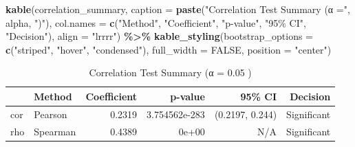 \documentclass[
  12pt,
]{article}
\newenvironment{Shaded}{\begin{snugshade}}{\end{snugshade}}
\newcommand{\AttributeTok}[1]{\textcolor[rgb]{0.13,0.29,0.53}{#1}}
\newcommand{\ConstantTok}[1]{\textcolor[rgb]{0.56,0.35,0.01}{#1}}
\newcommand{\FunctionTok}[1]{\textcolor[rgb]{0.13,0.29,0.53}{\textbf{#1}}}
\newcommand{\NormalTok}[1]{#1}
\newcommand{\SpecialCharTok}[1]{\textcolor[rgb]{0.81,0.36,0.00}{\textbf{#1}}}
\newcommand{\StringTok}[1]{\textcolor[rgb]{0.31,0.60,0.02}{#1}}
\begin{document}
\begin{Shaded}
\begin{Highlighting}[]
\FunctionTok{kable}\NormalTok{(correlation\_summary, }\AttributeTok{caption =} \FunctionTok{paste}\NormalTok{(}\StringTok{"Correlation Test Summary (α ="}\NormalTok{,}
\NormalTok{    alpha, }\StringTok{")"}\NormalTok{), }\AttributeTok{col.names =} \FunctionTok{c}\NormalTok{(}\StringTok{"Method"}\NormalTok{, }\StringTok{"Coefficient"}\NormalTok{, }\StringTok{"p{-}value"}\NormalTok{,}
    \StringTok{"95\% CI"}\NormalTok{, }\StringTok{"Decision"}\NormalTok{), }\AttributeTok{align =} \StringTok{"lrrrr"}\NormalTok{) }\SpecialCharTok{\%\textgreater{}\%}
    \FunctionTok{kable\_styling}\NormalTok{(}\AttributeTok{bootstrap\_options =} \FunctionTok{c}\NormalTok{(}\StringTok{"striped"}\NormalTok{, }\StringTok{"hover"}\NormalTok{, }\StringTok{"condensed"}\NormalTok{),}
        \AttributeTok{full\_width =} \ConstantTok{FALSE}\NormalTok{, }\AttributeTok{position =} \StringTok{"center"}\NormalTok{)}
\end{Highlighting}
\end{Shaded}

\begin{longtable}[t]{llrrrr}
\caption{\label{tab:unnamed-chunk-18}Correlation Test Summary (α = 0.05 )}\\
\toprule
 & Method & Coefficient & p-value & 95\% CI & Decision\\
\midrule
cor & Pearson & 0.2319 & 3.754562e-283 & (0.2197, 0.244) & Significant\\
rho & Spearman & 0.4389 & 0e+00 & N/A & Significant\\
\bottomrule
\end{longtable}
\end{document}
